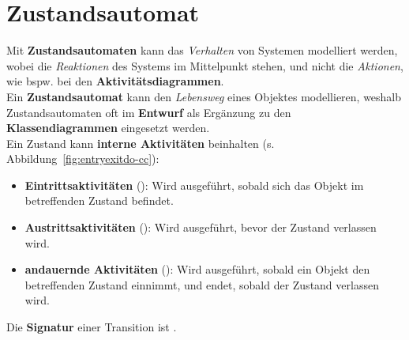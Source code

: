 \section{Zustandsautomat}

\begin{tcolorbox}[title=Zustandsautomat]
    Mit \textbf{Zustandsautomaten} kann das \textit{Verhalten} von Systemen modelliert werden, wobei die \textit{Reaktionen} des Systems im Mittelpunkt stehen, und nicht die \textit{Aktionen}, wie bspw. bei den \textbf{Aktivitätsdiagrammen}.\\

    \noindent
        Ein \textbf{Zustandsautomat} kann den \textit{Lebensweg} eines Objektes modellieren, weshalb Zustandsautomaten oft im \textbf{Entwurf} als Ergänzung zu den \textbf{Klassendiagrammen} eingesetzt werden.\\

    \noindent
    Ein Zustand kann \textbf{interne Aktivitäten} beinhalten (s. Abbildung~\ref{fig:entryexitdo-cc}):

    \begin{itemize}
      \item \textbf{Eintrittsaktivitäten} (): Wird ausgeführt, sobald sich das Objekt im betreffenden Zustand befindet.
      \item \textbf{Austrittsaktivitäten} (): Wird ausgeführt, bevor der Zustand verlassen wird.
      \item \textbf{andauernde Aktivitäten} (): Wird ausgeführt, sobald ein Objekt den betreffenden Zustand einnimmt, und endet, sobald der Zustand verlassen wird.
    \end{itemize}

    \noindent
    Die \textbf{Signatur} einer Transition ist .
\end{tcolorbox}

